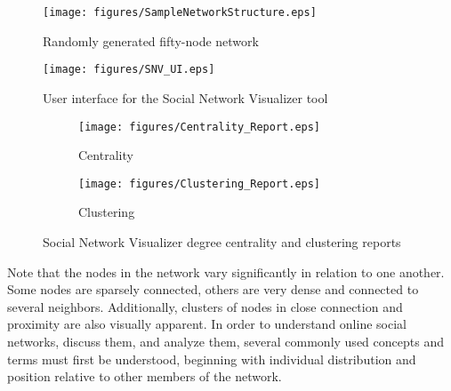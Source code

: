 {\begin{figure}[!htbp] \centering
  \texttt{[image: figures/SampleNetworkStructure.eps]}
  \caption{Randomly generated fifty-node network}
  \label{fig:SampleNetworkStructure}
\end{figure}

\begin{figure}[!htbp] \centering
  \texttt{[image: figures/SNV\_UI.eps]}
  \caption{User interface for the Social Network Visualizer tool}
  \label{fig:SNV_UI}
\end{figure}

\begin{figure}[!htbp] \centering
\begin{subfigure}[b]{0.4\textwidth}
  \texttt{[image: figures/Centrality\_Report.eps]}
  \caption{Centrality}
\end{subfigure}
\begin{subfigure}[b]{0.4\textwidth}
  \texttt{[image: figures/Clustering\_Report.eps]}
  \caption{Clustering}
\end{subfigure}
  \caption{Social Network Visualizer degree centrality and clustering reports}
  \label{fig:SNV_Reports}
\end{figure}
Note that the nodes in the network vary significantly in relation to one another. Some nodes are sparsely connected, others are very dense and connected to several neighbors. Additionally, clusters of nodes in close connection and proximity are also visually apparent. In order to understand online social networks, discuss them, and analyze them,  several commonly used concepts and terms must first be understood, beginning with individual distribution and position relative to other members of the network. 

}
